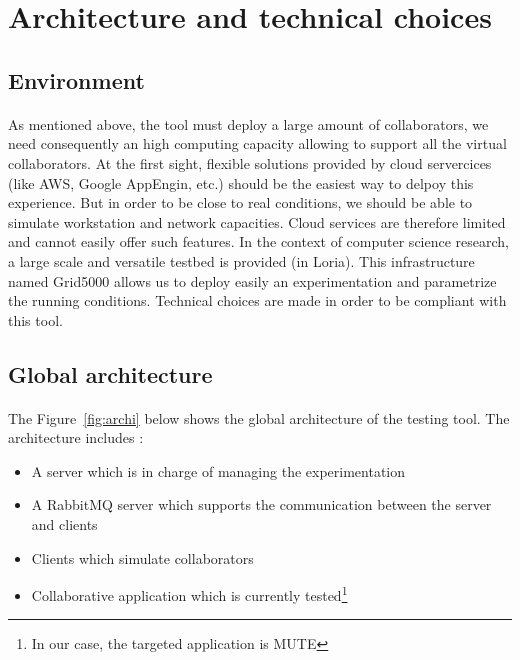 \documentclass[twoside,twocolumn]{article}
\begin{document}

\section{Architecture and technical choices}

\subsection{Environment}
\paragraph{}
As mentioned above, the tool must deploy a large amount of collaborators, we need consequently an high computing capacity allowing to support all the virtual collaborators.
At the first sight, flexible solutions provided by cloud servercices (like AWS, Google AppEngin, etc.) should be the easiest way to delpoy this experience.
But in order to be close to real conditions, we should be able to simulate workstation and network capacities. Cloud services are therefore limited and cannot easily offer such features.
In the context of computer science research, a large scale and versatile testbed is provided (in Loria).
This infrastructure named Grid5000 allows us to deploy easily an experimentation and parametrize the running conditions.
Technical choices are made in order to be compliant with this tool.

\subsection{Global architecture}
\paragraph{}
The Figure~\ref{fig:archi} below shows the global architecture of the testing tool. The architecture includes :

\begin{itemize}
  \item A server which is in charge of managing the experimentation
  \item A RabbitMQ server which supports the communication between the server and clients
  \item Clients which simulate collaborators
  \item Collaborative application which is currently tested\footnote{In our case, the targeted application is MUTE}
\end{itemize}
\end{document}
